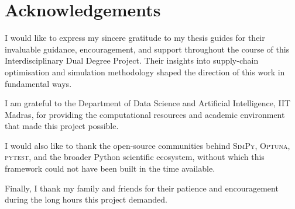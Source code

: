 \chapter{Acknowledgements}

I would like to express my sincere gratitude to my thesis guides for their
invaluable guidance, encouragement, and support throughout the course of
this Interdisciplinary Dual Degree Project.  Their insights into supply-chain
optimisation and simulation methodology shaped the direction of this work
in fundamental ways.

I am grateful to the Department of Data Science and Artificial Intelligence,
IIT Madras, for providing the computational resources and academic environment
that made this project possible.

I would also like to thank the open-source communities behind \textsc{SimPy},
\textsc{Optuna}, \textsc{pytest}, and the broader Python scientific ecosystem,
without which this framework could not have been built in the time available.

Finally, I thank my family and friends for their patience and encouragement
during the long hours this project demanded.
